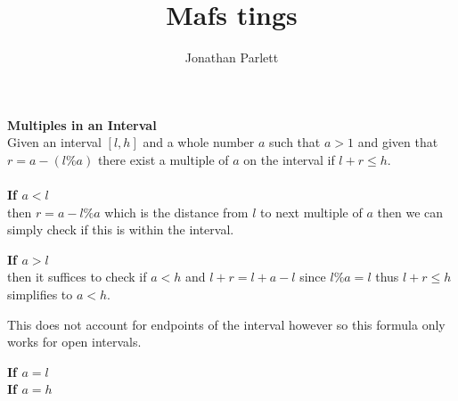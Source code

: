 \documentclass[14pt]{extreport}
\title{Mafs tings}
\author{Jonathan Parlett}
\begin{document}
\textbf{Multiples in an Interval}\\
Given an interval $[l, h]$ and a whole number $a$ such that $a > 1$ and given that $r = a - (l\%a)$
there exist a multiple of $a$ on the interval if $l + r \le h$.\\\\

\textbf{If $a < l$}\\
then $r = a - l\%a$ which is the distance from $l$ to next multiple of $a$ then we can simply check if this is within the interval.

\textbf{If $a > l$}\\
then it suffices to check if $a < h$ and $l + r = l + a - l$ since $l\%a = l$ thus $l + r \le h$ simplifies to $a < h$.

This does not account for endpoints of the interval however so this formula only works for open intervals.

\textbf{If $a = l$}\\

\textbf{If $a = h$}\\
\end{document}
